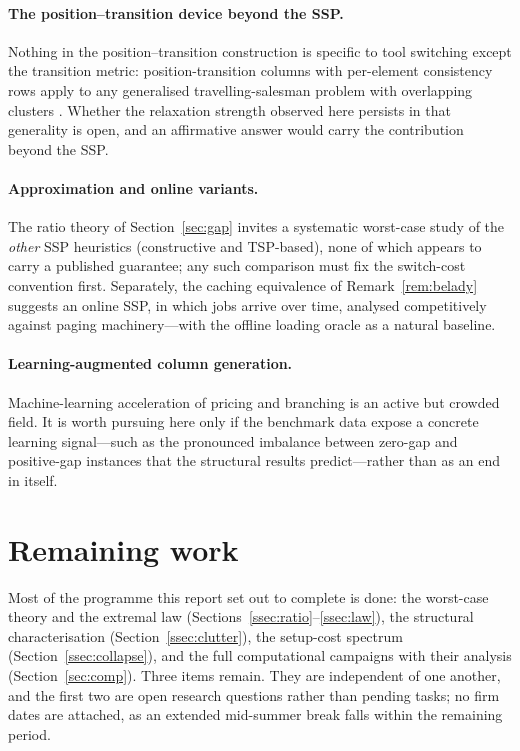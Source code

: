 \documentclass[11pt,a4paper]{article}
\theoremstyle{plain}
\theoremstyle{definition}
\theoremstyle{remark}
\begin{document}
\paragraph{The position--transition device beyond the SSP.}
Nothing in the position--transition construction is specific to tool switching except
the transition metric: position-transition columns with per-element consistency rows
apply to any generalised travelling-salesman problem with overlapping clusters
\citep{Pop2024}. Whether the relaxation strength observed here persists in that
generality is open, and an affirmative answer would carry the contribution beyond the
SSP.

\paragraph{Approximation and online variants.}
The ratio theory of Section~\ref{sec:gap} invites a systematic worst-case study of
the \emph{other} SSP heuristics (constructive and TSP-based), none of which appears
to carry a published guarantee; any such comparison must fix the switch-cost
convention first. Separately, the caching equivalence of
Remark~\ref{rem:belady} suggests an online SSP, in which jobs arrive over time,
analysed competitively against paging machinery---with the offline loading oracle as
a natural baseline.

\paragraph{Learning-augmented column generation.}
Machine-learning acceleration of pricing and branching
\citep{Bengio2021,Gasse2019,Morabit2021} is an active but crowded field. It is worth
pursuing here only if the benchmark data expose a concrete learning signal---such as
the pronounced imbalance between zero-gap and positive-gap instances that the
structural results predict---rather than as an end in itself.

\section{Remaining work}\label{sec:planned}
Most of the programme this report set out to complete is done: the worst-case
theory and the extremal law (Sections~\ref{ssec:ratio}--\ref{ssec:law}), the
structural characterisation (Section~\ref{ssec:clutter}), the setup-cost spectrum
(Section~\ref{ssec:collapse}), and the full computational campaigns with their
analysis (Section~\ref{sec:comp}). Three items remain. They are independent of
one another, and the first two are open research questions rather than pending
tasks; no firm dates are attached, as an extended mid-summer break falls within
the remaining period.
\end{document}

